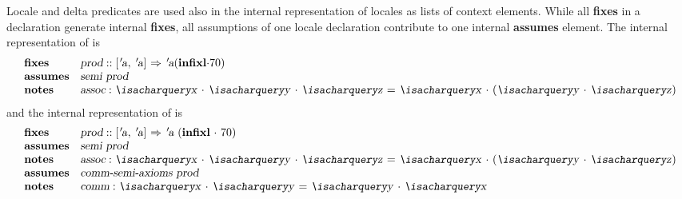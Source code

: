 \begin{isabellebody}
\begin{isamarkuptext}
  Locale and delta predicates are used also in the internal
  representation of locales as lists of context elements.  While all
  \textbf{fixes} in a
  declaration generate internal \textbf{fixes}, all assumptions
  of one locale declaration contribute to one internal \textbf{assumes}
  element.  The internal representation of  is
\[
\begin{array}{ll}
  \textbf{fixes} & \isa{prod} :: \isa{{\isachardoublequote}{\isacharbrackleft}{\isacharprime}a{\isacharcomma}\ {\isacharprime}a{\isacharbrackright}\ {\isasymRightarrow}\ {\isacharprime}a{\isachardoublequote}}
    (\textbf{infixl} \isa{{\isachardoublequote}{\isasymcdot}{\isachardoublequote}} 70) \\
  \textbf{assumes} & \isa{{\isachardoublequote}semi\ prod{\isachardoublequote}} \\
  \textbf{notes} & \isa{assoc}: \isa{{\isachardoublequote}{\isacharquery}x\ {\isasymcdot}\ {\isacharquery}y\ {\isasymcdot}\ {\isacharquery}z\ {\isacharequal}\ {\isacharquery}x\ {\isasymcdot}\ {\isacharparenleft}{\isacharquery}y\ {\isasymcdot}\ {\isacharquery}z{\isacharparenright}{\isachardoublequote}}
\end{array}
\]
  and the internal representation of  is
\begin{equation}
\label{eq-comm-semi}
\begin{array}{ll}
  \textbf{fixes} & \isa{prod} :: \isa{{\isachardoublequote}{\isacharbrackleft}{\isacharprime}a{\isacharcomma}\ {\isacharprime}a{\isacharbrackright}\ {\isasymRightarrow}\ {\isacharprime}a{\isachardoublequote}}
    ~(\textbf{infixl}~\isa{{\isachardoublequote}{\isasymcdot}{\isachardoublequote}}~70) \\
  \textbf{assumes} & \isa{{\isachardoublequote}semi\ prod{\isachardoublequote}} \\
  \textbf{notes} & \isa{assoc}: \isa{{\isachardoublequote}{\isacharquery}x\ {\isasymcdot}\ {\isacharquery}y\ {\isasymcdot}\ {\isacharquery}z\ {\isacharequal}\ {\isacharquery}x\ {\isasymcdot}\ {\isacharparenleft}{\isacharquery}y\ {\isasymcdot}\ {\isacharquery}z{\isacharparenright}{\isachardoublequote}} \\
  \textbf{assumes} & \isa{{\isachardoublequote}comm{\isacharunderscore}semi{\isacharunderscore}axioms\ prod{\isachardoublequote}} \\
  \textbf{notes} & \isa{comm}: \isa{{\isachardoublequote}{\isacharquery}x\ {\isasymcdot}\ {\isacharquery}y\ {\isacharequal}\ {\isacharquery}y\ {\isasymcdot}\ {\isacharquery}x{\isachardoublequote}} \\

\end{array}
\end{equation}
\end{isamarkuptext}
\end{isabellebody}
